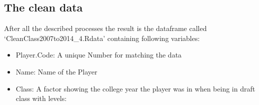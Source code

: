 \documentclass[]{article}
\providecommand{\tightlist}{%
  \setlength{\itemsep}{0pt}\setlength{\parskip}{0pt}}
\begin{document}
\hypertarget{the-clean-data}{%
\subsection{The clean data}\label{the-clean-data}}

After all the described processes the result is the dataframe called
`CleanClass2007to2014\_4.Rdata' containing following variables:

\begin{itemize}
\tightlist
\item
  Player.Code: A unique Number for matching the data
\item
  Name: Name of the Player
\item
  Class: A factor showing the college year the player was in when being
  in draft class with levels:


\end{itemize}
\end{document}
